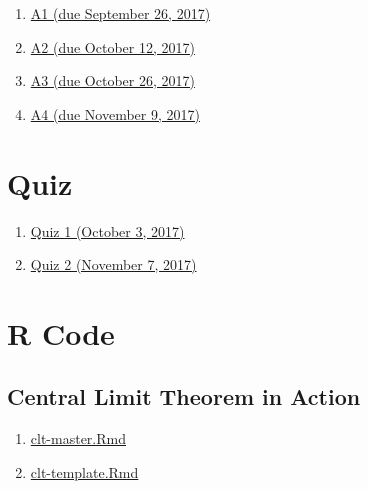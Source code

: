 \documentclass[]{book}
\providecommand{\tightlist}{%
  \setlength{\itemsep}{0pt}\setlength{\parskip}{0pt}}
\theoremstyle{definition}
\theoremstyle{definition}
\theoremstyle{definition}
\theoremstyle{remark}
\begin{document}
\begin{enumerate}
\def\labelenumi{\arabic{enumi}.}
\tightlist
\item
  \href{https://github.com/sahirbhatnagar/MATH697/blob/master/images/HW-1-F2017.pdf}{A1
  (due September 26, 2017)}
\item
  \href{https://github.com/sahirbhatnagar/MATH697/blob/master/images/HW-2-F2017.pdf}{A2
  (due October 12, 2017)}
\item
  \href{https://github.com/sahirbhatnagar/MATH697/blob/master/images/HW-3-F2017.pdf}{A3
  (due October 26, 2017)}
\item
  \href{https://github.com/sahirbhatnagar/MATH697/blob/master/images/HW-4-F2017.pdf}{A4
  (due November 9, 2017)}
\end{enumerate}

\chapter*{Quiz}\label{quiz}

\begin{enumerate}
\def\labelenumi{\arabic{enumi}.}
\tightlist
\item
  \href{https://github.com/sahirbhatnagar/MATH697/blob/master/images/quiz-1-F2017.pdf}{Quiz
  1 (October 3, 2017)}
\item
  \href{https://github.com/sahirbhatnagar/MATH697/blob/master/images/quiz-2-F2017.pdf}{Quiz
  2 (November 7, 2017)}
\end{enumerate}

\chapter*{R Code}\label{r-code}

\section{Central Limit Theorem in
Action}\label{central-limit-theorem-in-action}

\begin{enumerate}
\def\labelenumi{\arabic{enumi}.}
\tightlist
\item
  \href{https://github.com/sahirbhatnagar/MATH697/blob/master/images/clt-master.Rmd}{clt-master.Rmd}\\
\item
  \href{https://github.com/sahirbhatnagar/MATH697/blob/master/images/clt-template.Rmd}{clt-template.Rmd}
\end{enumerate}
\end{document}
